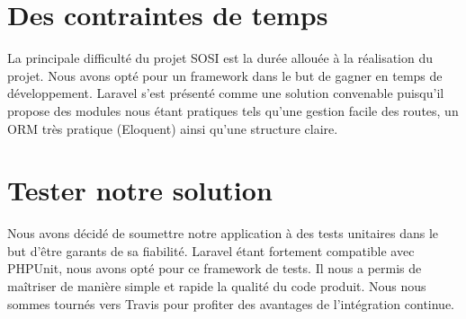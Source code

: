 \section{Des contraintes de temps}

La principale difficulté du projet SOSI est la durée allouée à la réalisation du projet.
Nous avons opté pour un framework dans le but de gagner en temps de développement. Laravel
s'est présenté comme une solution convenable puisqu'il propose des modules nous étant pratiques
tels qu'une gestion facile des routes, un ORM très pratique (Eloquent) ainsi qu'une structure
claire.

\section{Tester notre solution}

Nous avons décidé de soumettre notre application à des tests unitaires dans le but d'être garants de sa fiabilité. Laravel étant fortement compatible avec PHPUnit, nous avons opté pour ce framework de tests. Il nous a permis de maîtriser de manière simple et rapide la qualité du code produit. Nous nous sommes tournés vers Travis pour profiter des avantages de l'intégration continue.
